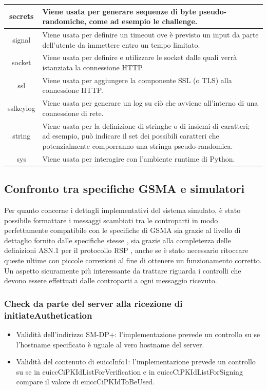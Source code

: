 \documentclass[10pt, oneside]{book}
\begin{document}
\begin{table}[h!]
\begin{center}
\begin{tabularx}{\textwidth}{|c|X|}
\hline
secrets & Viene usata per generare sequenze di byte pseudo-randomiche, come ad esempio le challenge.\\
\hline
signal & Viene usata per definire un timeout ove è previsto un input da parte dell'utente da immettere entro un tempo limitato.\\
\hline
socket & Viene usata per definire e utilizzare le socket dalle quali verrà istanziata la connessione HTTP.\\
\hline
ssl & Viene usata per aggiungere la componente SSL (o TLS) alla connessione HTTP.\\
\hline
sslkeylog & Viene usata per generare un log su ciò che avviene all'interno di una connessione di rete.\\
\hline
string & Viene usata per la definizione di stringhe o di insiemi di caratteri; ad esempio, può indicare il set dei possibili caratteri che potenzialmente comporranno una stringa pseudo-randomica.\\
\hline
sys & Viene usata per interagire con l'ambiente runtime di Python.\\
\hline
\end{tabularx}
\end{center}
\end{table}

\subsection{Confronto tra specifiche GSMA e simulatori}
Per quanto concerne i dettagli implementativi del sistema simulato, è stato possibile formattare i messaggi scambiati tra le controparti in modo perfettamente compatibile con le specifiche di GSMA sia grazie al livello di dettaglio fornito dalle specifiche stesse \cite{GSMA-docs-new}, sia grazie alla completezza delle definizioni ASN.1 per il protocollo RSP \cite{RSP-definitions}, anche se è stato necessario ritoccare queste ultime con piccole correzioni al fine di ottenere un funzionamento corretto. Un aspetto sicuramente più interessante da trattare riguarda i controlli che devono essere effettuati dalle controparti a ogni messaggio ricevuto.

\subsubsection{Check da parte del server alla ricezione di initiateAuthetication}
\begin{itemize}
\item Validità dell'indirizzo SM-DP+: l'implementazione prevede un controllo su se l'hostname specificato è uguale al vero hostname del server.
\item Validità del contenuto di euiccInfo1: l'implementazione prevede un controllo su se in euiccCiPKIdListForVerification e in euiccCiPKIdListForSigning compare il valore di euiccCiPKIdToBeUsed.
\end{itemize}
\end{document}
